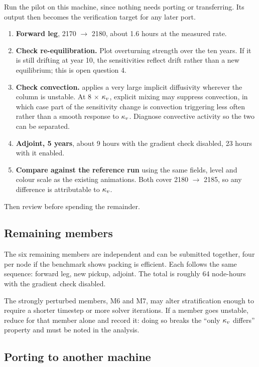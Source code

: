 Run the pilot on this machine, since nothing needs porting or transferring. Its
output then becomes the verification target for any later port.

\begin{enumerate}
  \item \textbf{Forward leg}, 2170 $\rightarrow$ 2180, about 1.6 hours at the
        measured rate.
  \item \textbf{Check re-equilibration.} Plot overturning strength over the ten
        years. If it is still drifting at year 10, the sensitivities reflect
        drift rather than a new equilibrium; this is open question 4.
  \item \textbf{Check convection.}  applies a very large
        implicit diffusivity wherever the column is unstable. At 8 $\times$
        $\kappa_{v}$, explicit mixing may suppress convection, in which case part of the
        sensitivity change is convection triggering less often rather than a
        smooth response to $\kappa_{v}$. Diagnose convective activity so the two can be
        separated.
  \item \textbf{Adjoint, 5 years}, about 9 hours with the gradient check
        disabled, 23 hours with it enabled.
  \item \textbf{Compare against the reference run} using the same fields, level
        and colour scale as the existing animations. Both cover
        2180 $\rightarrow$ 2185, so any difference is attributable to $\kappa_{v}$.
\end{enumerate}

Then review before spending the remainder.

\subsection{Remaining members}

The six remaining members are independent and can be submitted together, four per
node if the benchmark shows packing is efficient. Each follows the same sequence:
forward leg, new pickup, adjoint. The total is roughly 64 node-hours with the
gradient check disabled.

The strongly perturbed members, M6 and M7, may alter stratification enough to
require a shorter timestep or more solver iterations. If a member goes unstable,
reduce  for that member alone and record it: doing so breaks the
``only $\kappa_{v}$ differs'' property and must be noted in the analysis.

\subsection{Porting to another machine}

